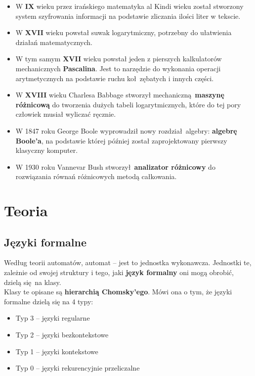 \documentclass[leqno, 12pt]{article}
\begin{document}
		\begin{itemize}
			\item W \textbf{IX} wieku
				przez irańskiego matematyka al Kindi wieku został stworzony system szyfrowania informacji na
				podstawie zliczania ilości liter w tekscie.

			\item W \textbf{XVII} wieku powstał suwak logarytmiczny, potrzebny do ułatwienia działań
				matematycznych.
			
			\item W tym samym \textbf{XVII} wieku powstał jeden z pierszych kalkulatorów mechanicznych
				\textbf{Pascalina}. Jest to narzędzie do wykonania operacji arytmetycznych na podstawie
				ruchu koł zębatych i innych części.
				
			\item W \textbf{XVIII} wieku Charlesa Babbage stworzył mechaniczną \textbf{maszynę
				różnicową} do tworzenia dużych tabeli logarytmicznych, które do tej pory człowiek
				musiał wyliczać ręcznie.
			
			\item W 1847 roku George Boole wyprowadził nowy rozdział algebry: \textbf{algebrę Boole'a},
				na podstawie której później został zaprojektowany pierwszy klasyczny komputer.
			
			\item W 1930 roku Vannevar Bush stworzył \textbf{analizator różnicowy} do rozwiązania
				równań różnicowych metodą całkowania.
			
			

		\end{itemize}

		\newpage
		
	\section{Teoria}

		\subsection{Języki formalne}

			Według teorii automatów, automat -- jest to jednostka wykonawcza. Jednostki te, zależnie od swojej
			struktury i tego, jaki \textbf{język formalny} oni mogą obrobić, dzielą się na klasy.
			\\
			
			Klasy te opisane są \textbf{hierarchią Chomsky’ego}. Mówi ona o tym, że języki formalne dzielą się na
			4 typy:
			\begin{itemize}
				\item Typ 3 -- języki regularne
				\item Typ 2 -- języki bezkontekstowe
				\item Typ 1 -- języki kontekstowe
				\item Typ 0 -- języki rekurencyjnie przeliczalne
			\end{itemize}
			
\end{document}
